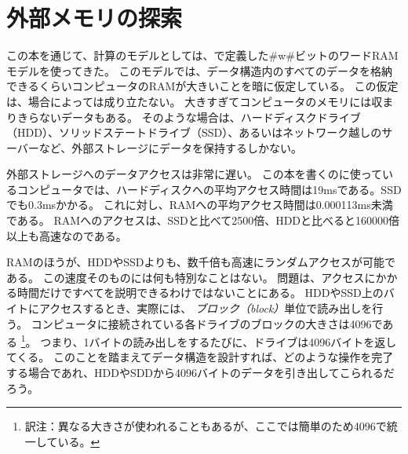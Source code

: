 \chapter{外部メモリの探索}
この本を通じて、計算のモデルとしては、で定義した#w#ビットのワードRAMモデルを使ってきた。
このモデルでは、データ構造内のすべてのデータを格納できるくらいコンピュータのRAMが大きいことを暗に仮定している。
この仮定は、場合によっては成り立たない。
大きすぎてコンピュータのメモリには収まりきらないデータもある。
そのような場合は、ハードディスクドライブ（HDD）、ソリッドステートドライブ（SSD）、あるいはネットワーク越しのサーバーなど、外部ストレージにデータを保持するしかない。

%
%
%
%
外部ストレージへのデータアクセスは非常に遅い。
この本を書くのに使っているコンピュータでは、ハードディスクへの平均アクセス時間は19msである。SSDでも0.3msかかる。
これに対し、RAMへの平均アクセス時間は0.000113ms未満である。
RAMへのアクセスは、SSDと比べて2500倍、HDDと比べると160000倍以上も高速なのである。

% 
% 

RAMのほうが、HDDやSSDよりも、数千倍も高速にランダムアクセスが可能である。
この速度そのものには何も特別なことはない。
問題は、アクセスにかかる時間だけですべてを説明できるわけではないことにある。
HDDやSSD上のバイトにアクセスするとき、実際には、
\emph{ブロック（block）}単位で読み出しを行う。
%
コンピュータに接続されている各ドライブのブロックの大きさは4096である
\footnote{訳注：異なる大きさが使われることもあるが、ここでは簡単のため4096で統一している。}。
つまり、1バイトの読み出しをするたびに、ドライブは4096バイトを返してくる。
このことを踏まえてデータ構造を設計すれば、どのような操作を完了する場合であれ、HDDやSDDから4096バイトのデータを引き出してこられるだろう。

